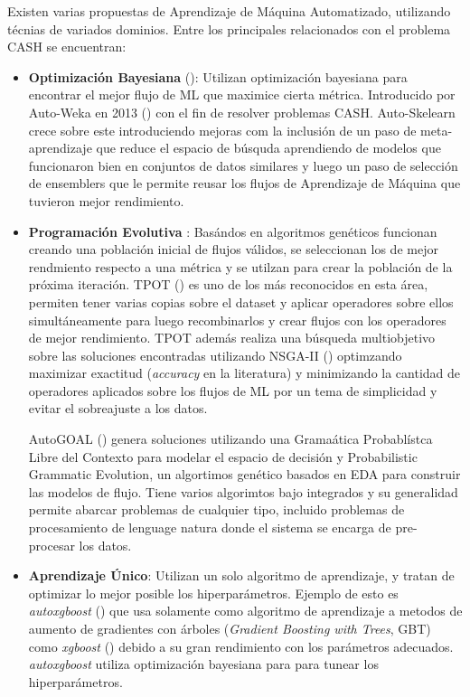 Existen varias propuestas de Aprendizaje de M\'aquina Automatizado, utilizando t\'ecnias de variados dominios. Entre los principales relacionados con el problema CASH se encuentran:
\begin{itemize}
    \item \textbf{Optimizaci\'on Bayesiana} (\cite{hutter2019automated}): Utilizan optimizaci\'on bayesiana para encontrar el mejor flujo de ML que maximice cierta m\'etrica. Introducido por Auto-Weka en 2013 (\cite{thornton2013auto}) con el fin de resolver problemas CASH. Auto-Skelearn \cite{feurer2015efficient} crece sobre este introduciendo mejoras com la inclusi\'on de un paso de meta-aprendizaje que reduce el espacio de b\'usquda aprendiendo de modelos que funcionaron bien en conjuntos de datos similares y luego un paso de selecci\'on de ensemblers que le permite reusar los flujos de Aprendizaje de M\'aquina que tuvieron mejor rendimiento.
    
    \item \textbf{Programaci\'on Evolutiva} \cite{chen2018autostacker}: Bas\'andos en algoritmos gen\'eticos funcionan creando una poblaci\'on inicial de flujos v\'alidos, se seleccionan los de mejor rendmiento respecto a una m\'etrica y se utilzan para crear la poblaci\'on de la pr\'oxima iteraci\'on. TPOT (\cite{pmlr-v64-olson_tpot_2016}) es uno de los m\'as reconocidos en esta \'area, permiten tener varias copias sobre el dataset y aplicar operadores sobre ellos simult\'aneamente para luego recombinarlos y crear flujos con los operadores de mejor rendimiento. TPOT adem\'as realiza una b\'usqueda multiobjetivo sobre las soluciones encontradas utilizando NSGA-II (\cite{deb2002fast}) optimzando maximizar exactitud (\textit{accuracy} en la literatura) y minimizando la cantidad de operadores aplicados sobre los flujos de ML por un tema de simplicidad y evitar el sobreajuste a los datos.

        AutoGOAL (\cite{estevez2020solving}) genera soluciones utilizando una Grama\'atica Probabl\'istca Libre del Contexto para modelar el espacio de decisi\'on y Probabilistic Grammatic Evolution, un algortimos gen\'etico basados en EDA para construir las modelos de flujo. Tiene varios algorimtos bajo integrados y su generalidad permite abarcar problemas de cualquier tipo, incluido problemas de procesamiento de lenguage natura donde el sistema se encarga de pre-procesar los datos.

    \item \textbf{Aprendizaje \'Unico}: Utilizan un solo algoritmo de aprendizaje, y tratan de optimizar lo mejor posible los hiperpar\'ametros. Ejemplo de esto es \textit{autoxgboost} (\cite{thomas2018automatic}) que usa solamente como algoritmo de aprendizaje a metodos de aumento de gradientes con \'arboles (\textit{Gradient Boosting with Trees}, GBT) como \textit{xgboost} (\cite{chen2016xgboost}) debido a su gran rendimiento con los par\'ametros adecuados. \textit{autoxgboost} utiliza optimizaci\'on bayesiana para para tunear los hiperpar\'ametros.
    
\end{itemize}

